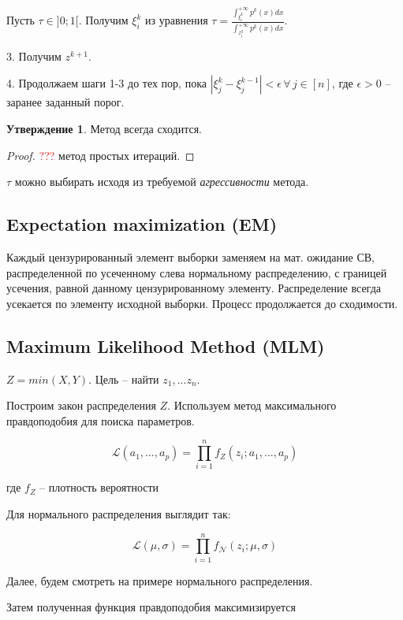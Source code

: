 \documentclass[reqno]{article}
\theoremstyle{definition}
\theoremstyle{definition}
\theoremstyle{definition}
\theoremstyle{definition}
\theoremstyle{definition}
\theoremstyle{definition}
\theoremstyle{definition}
\theoremstyle{definition}
\theoremstyle{definition}
\newtheorem{state}{Утверждение}[section]
\begin{document}
		Пусть $\tau \in ]0; 1[$. Получим $\xi_i^{k}$ из уравнения $\tau = \frac{\int_{\xi^{k}_i}^{+\infty} p^{k}(x) dx}{\int_{z_i^0}^{+\infty} p^{k}(x) dx}$.
		
		3. Получим $z^{k + 1}$.
		
		4. Продолжаем шаги 1-3 до тех пор, пока $|\xi^k_j - \xi^{k - 1}_j| < \epsilon \, \forall \, j \in [n]$, где $\epsilon > 0$ -- заранее заданный порог.
		
		\begin{state}
			Метод всегда сходится.
		\end{state}
		\begin{proof}
			\textcolor{red}{???} метод простых итераций.
		\end{proof}
		
		$\tau$ можно выбирать исходя из требуемой \textit{агрессивности} метода.
		
		\subsection{Expectation maximization (EM)}
		
		Каждый цензурированный элемент выборки заменяем на мат. ожидание СВ, распределенной по усеченному слева нормальному распределению, с границей усечения, равной данному цензурированному элементу. Распределение всегда усекается по элементу исходной выборки. Процесс продолжается до сходимости.
		
		\subsection{Maximum Likelihood Method (MLM)}
		
		$Z = min(X, Y)$. Цель -- найти $z_1, ... z_n$.
		
		Построим закон распределения $Z$. Используем метод максимального правдоподобия для поиска параметров.
		
		$$\mathcal{L}(a_1, ..., a_p) = \prod^n_{i = 1} f_Z(z_i; a_1, ... , a_p)$$
			
		где $f_Z$ -- плотность вероятности
		
		Для нормального распределения выглядит так:
		
		$$\mathcal{L}(\mu, \sigma) = \prod^n_{i = 1} f_\mathcal{N}(z_i; \mu, \sigma)$$
		
		Далее, будем смотреть на примере нормального распределения.
		
		Затем полученная функция правдоподобия максимизируется
		
\end{document}
